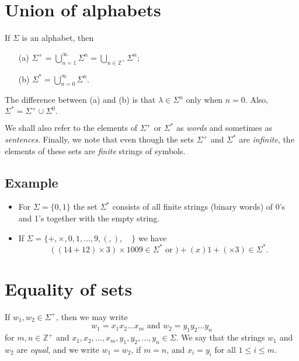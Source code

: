 \documentclass[11pt]{article}
\begin{document}
    \section{Union of alphabets}

    If \(\Sigma\) is an alphabet, then 
    \begin{enumerate}
        \item[(a)] \(\Sigma^+ = \bigcup_{n=1}^{\infty} \Sigma^n = \bigcup_{n \in \mathbb{Z}^+} \Sigma^n;\)
        \item[(b)] \(\Sigma^* = \bigcup_{n = 0}^{\infty} \Sigma^n.\)
    \end{enumerate}
    The difference between (a) and (b) is that \(\lambda \in \Sigma^n\) only when \(n = 0\). Also, \(\Sigma^* = \Sigma^+ \cup \Sigma^0.\)

    We shall also refer to the elements of \(\Sigma^+\) or \(\Sigma^*\) as \emph{words} and sometimes as \emph{sentences}. Finally, we note that even though the sets \(\Sigma^+\) and \(\Sigma^*\) are \emph{infinite}, the elements of these sets are \emph{finite} strings of symbols.

    \subsection{Example}

    \begin{itemize}
        \item For \(\Sigma = \{0,1\}\) the set \(\Sigma^*\) consists of all finite strings (binary words) of 0's and 1's together with the empty string.
        \item If \(\Sigma = \{+, \times, 0,1, \dots, 9, (,), \hspace{1em}\}\) we have \[((14 + 12) \times 3) \times 1009 \in \Sigma^* \text{ or } )+(x)1+(\times 3) \in \Sigma^*.\]
    \end{itemize}

    \section{Equality of sets}

    If \(w_1,w_2 \in \Sigma^+\), then we may write \[ w_1 = x_1 x_2 \dots x_m \text{ and } w_2 = y_1 y_2 \dots y_n \] for \(m,n \in \mathbb{Z}^+\) and \(x_1, x_2, \dots, x_m, y_1, y_2, \dots, y_n \in \Sigma\). We say that the strings \(w_1\) and \(w_2\) are \emph{equal}, and we write \(w_1 = w_2\), if \(m = n\), and \(x_i = y_i\) for all \(1 \leq i \leq m\).
\end{document}
